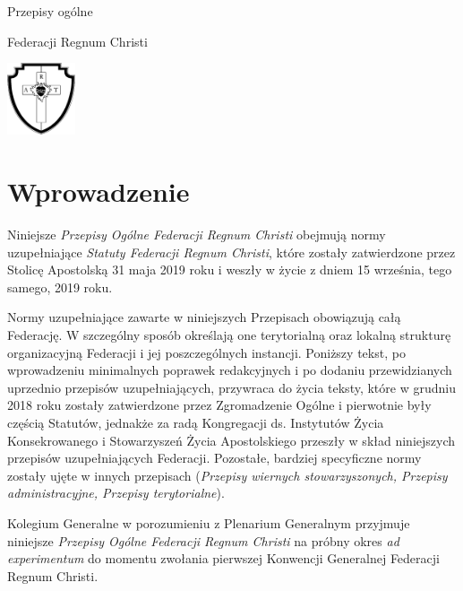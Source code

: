 ﻿\begin{center}

\thispagestyle{empty}

\vspace*{3cm}

{\Huge Przepisy ogólne}

{\Huge Federacji Regnum Christi}

\vspace*{2cm}

\includegraphics[width=2cm]{rc-logo-bw-712-755}

\end{center}

\cleardoublepage


\section*{Wprowadzenie}  Niniejsze {\em Przepisy Ogólne Federacji Regnum Christi} obejmują normy uzupełniające {\em Statuty Federacji Regnum Christi}, które zostały zatwierdzone przez Stolicę Apostolską 31 maja 2019 roku i weszły w życie z dniem 15 września, tego samego, 2019 roku.

Normy uzupełniające zawarte w niniejszych Przepisach obowiązują całą Federację. W szczególny sposób określają one terytorialną oraz lokalną strukturę organizacyjną Federacji i jej poszczególnych instancji. Poniższy tekst, po wprowadzeniu minimalnych poprawek redakcyjnych i po dodaniu przewidzianych uprzednio przepisów uzupełniających, przywraca do życia teksty, które w grudniu 2018 roku zostały zatwierdzone przez Zgromadzenie Ogólne i pierwotnie były częścią Statutów, jednakże za radą Kongregacji ds. Instytutów Życia Konsekrowanego i Stowarzyszeń Życia Apostolskiego przeszły w skład niniejszych przepisów uzupełniających Federacji. Pozostałe, bardziej specyficzne normy zostały ujęte w innych przepisach ({\em Przepisy wiernych stowarzyszonych, Przepisy administracyjne, Przepisy terytorialne}).

Kolegium Generalne w porozumieniu z Plenarium Generalnym przyjmuje niniejsze {\em Przepisy Ogólne Federacji Regnum Christi} na próbny okres {\em ad experimentum} do momentu zwołania pierwszej Konwencji Generalnej Federacji Regnum Christi.

